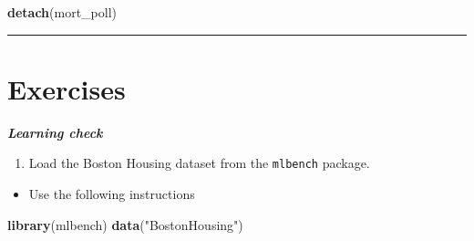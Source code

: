 \documentclass[
]{book}
\newenvironment{Shaded}{\begin{snugshade}}{\end{snugshade}}
\newcommand{\KeywordTok}[1]{\textcolor[rgb]{0.13,0.29,0.53}{\textbf{#1}}}
\newcommand{\NormalTok}[1]{#1}
\newcommand{\StringTok}[1]{\textcolor[rgb]{0.31,0.60,0.02}{#1}}
\providecommand{\tightlist}{%
  \setlength{\itemsep}{0pt}\setlength{\parskip}{0pt}}
\begin{document}
\begin{Shaded}
\begin{Highlighting}[]
\KeywordTok{detach}\NormalTok{(mort_poll)}
\end{Highlighting}
\end{Shaded}

\begin{center}\rule{0.5\linewidth}{0.5pt}\end{center}

\hypertarget{exercises}{%
\section{Exercises}\label{exercises}}

\textbf{\emph{Learning check}}

\begin{enumerate}
\def\labelenumi{\arabic{enumi}.}
\tightlist
\item
  Load the Boston Housing dataset from the \texttt{mlbench} package.
\end{enumerate}

\begin{itemize}
\tightlist
\item
  Use the following instructions
\end{itemize}

\begin{Shaded}
\begin{Highlighting}[]
\KeywordTok{library}\NormalTok{(mlbench)}
\KeywordTok{data}\NormalTok{(}\StringTok{"BostonHousing"}\NormalTok{)}
\end{Highlighting}
\end{Shaded}
\end{document}
